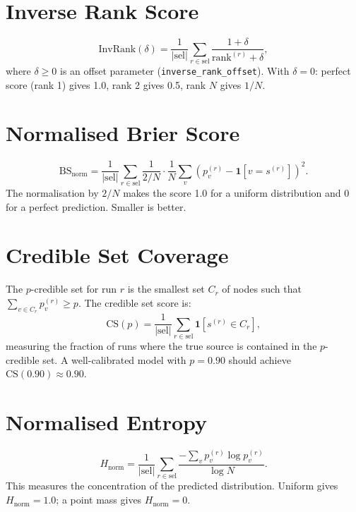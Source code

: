 \documentclass[12pt,a4paper]{report}
\begin{document}
\section{Inverse Rank Score}

\begin{equation}
  \text{InvRank}(\delta) = \frac{1}{|\text{sel}|} \sum_{r \in \text{sel}} \frac{1 + \delta}{\text{rank}^{(r)} + \delta},
\end{equation}
where $\delta \geq 0$ is an offset parameter (\texttt{inverse\_rank\_offset}).
With $\delta = 0$: perfect score (rank 1) gives 1.0, rank 2 gives 0.5, rank
$N$ gives $1/N$.

\section{Normalised Brier Score}

\begin{equation}
  \text{BS}_{\text{norm}} = \frac{1}{|\text{sel}|} \sum_{r \in \text{sel}} \frac{1}{2/N} \cdot \frac{1}{N} \sum_v (p_v^{(r)} - \mathbf{1}[v = s^{(r)}])^2.
\end{equation}
The normalisation by $2/N$ makes the score 1.0 for a uniform distribution and
0 for a perfect prediction. Smaller is better.

\section{Credible Set Coverage}

The $p$-credible set for run $r$ is the smallest set $C_r$ of nodes such that
$\sum_{v \in C_r} p_v^{(r)} \geq p$. The credible set score is:
\begin{equation}
  \text{CS}(p) = \frac{1}{|\text{sel}|} \sum_{r \in \text{sel}} \mathbf{1}[s^{(r)} \in C_r],
\end{equation}
measuring the fraction of runs where the true source is contained in the
$p$-credible set. A well-calibrated model with $p=0.90$ should achieve
$\text{CS}(0.90) \approx 0.90$.

\section{Normalised Entropy}

\begin{equation}
  H_{\text{norm}} = \frac{1}{|\text{sel}|} \sum_{r \in \text{sel}} \frac{-\sum_v p_v^{(r)} \log p_v^{(r)}}{\log N}.
\end{equation}
This measures the concentration of the predicted distribution. Uniform gives
$H_{\text{norm}} = 1.0$; a point mass gives $H_{\text{norm}} = 0$.
\end{document}
